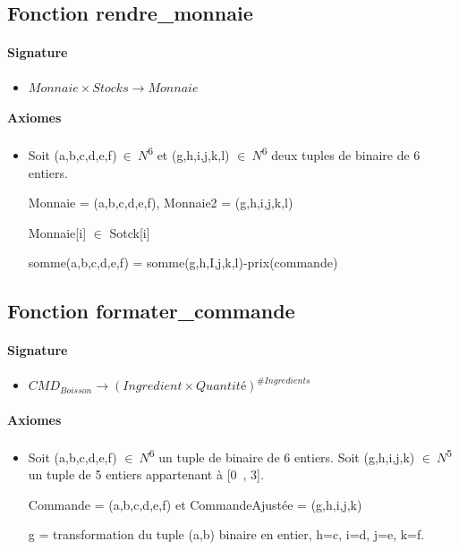 \documentclass[]{article}
\begin{document}
\pagebreak

\subsection*{Fonction rendre\_monnaie}
\paragraph{Signature}
\begin{itemize}
\item
  $Monnaie \times Stocks \longrightarrow  Monnaie$
\end{itemize}
\paragraph{Axiomes}
\begin{itemize}
\item
Soit (a,b,c,d,e,f)\(\  \in \ N\)\textsuperscript{6} et
  (g,h,i,j,k,l) \(\in \ N\)\textsuperscript{6} deux tuples de binaire de
  6 entiers.

Monnaie = (a,b,c,d,e,f), Monnaie2 = (g,h,i,j,k,l)

Monnaie{[}i{]} \(\in \) Sotck{[}i{]}

somme(a,b,c,d,e,f) = somme(g,h,I,j,k,l)-prix(commande)
\end{itemize}

\subsection*{Fonction formater\_commande}
\paragraph{Signature}
\begin{itemize}
\item
  $CMD_{Boisson} \longrightarrow  (Ingredient \times Quantité)^{\#Ingredients}$
\end{itemize}
\paragraph{Axiomes}
\begin{itemize}
\item
 Soit (a,b,c,d,e,f) \(\in \ N\)\textsuperscript{6} un tuple de
  binaire de 6 entiers. Soit (g,h,i,j,k) \(\in \ N\)\textsuperscript{5}
  un tuple de 5 entiers appartenant à {[}0~, 3{]}.

Commande = (a,b,c,d,e,f) et CommandeAjustée = (g,h,i,j,k)

g = transformation du tuple (a,b) binaire en entier, h=c, i=d, j=e, k=f.
\end{itemize}
\end{document}
